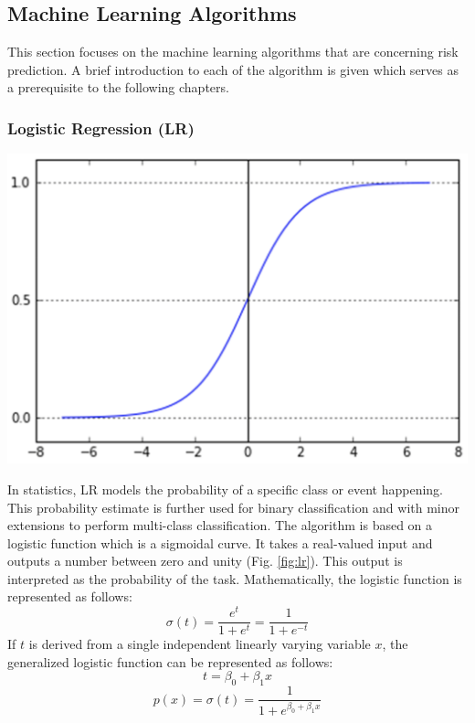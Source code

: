 \documentclass[a4paper, 12pt]{article}
\begin{document}
\subsection{Machine Learning Algorithms}

\noindent This section focuses on the machine learning algorithms that are concerning risk prediction. A brief introduction to each of the algorithm is given which serves as a prerequisite to the following chapters.

\subsubsection{Logistic Regression (LR)}
\begin{center}
\includegraphics[scale=0.45]{lr-paper.png}
\label{fig:lr}
\end{center}
In statistics, LR models the probability of a specific class or event happening. This probability estimate is further used for binary classification and with minor extensions to perform multi-class classification. The algorithm is based on a logistic function which is a sigmoidal curve. It takes a real-valued input and outputs a number between zero and unity (Fig. \ref{fig:lr}). This output is interpreted as the probability of the task. Mathematically, the logistic function is represented as follows:
\begin{equation}
\sigma(t) = \frac{e^t}{1 + e^t} = \frac{1}{1 + e^{-t}}
\end{equation}
If \(t\) is derived from a single independent linearly varying variable \(x\), the generalized logistic function can be represented as follows:
\begin{equation}
    t = \beta_0 + \beta_1x
    \end{equation}
    \begin{equation}
    p(x) = \sigma(t) = \frac{1}{1 + e^{\beta_0 + \beta_1x}}
\end{equation}
\vskip 0.2in
\end{document}
